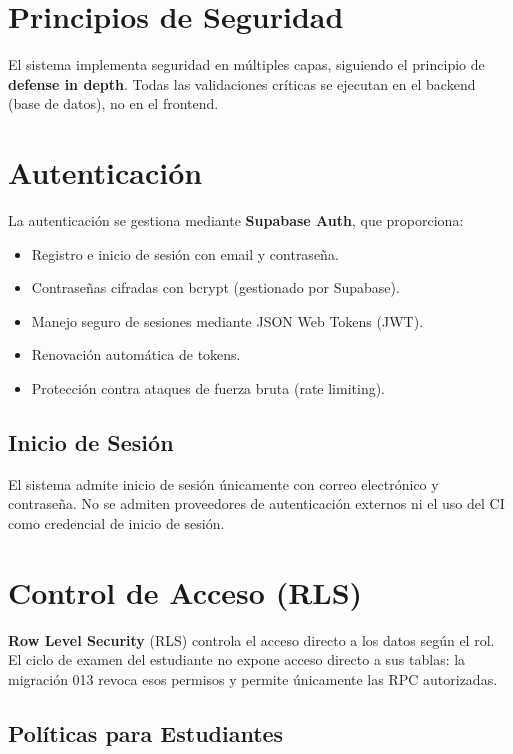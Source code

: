 \section{Principios de Seguridad}

El sistema implementa seguridad en múltiples capas, siguiendo el principio de \textbf{defense in depth}. Todas las validaciones críticas se ejecutan en el backend (base de datos), no en el frontend.

\section{Autenticación}

La autenticación se gestiona mediante \textbf{Supabase Auth}, que proporciona:

\begin{itemize}
    \item Registro e inicio de sesión con email y contraseña.
    \item Contraseñas cifradas con bcrypt (gestionado por Supabase).
    \item Manejo seguro de sesiones mediante JSON Web Tokens (JWT).
    \item Renovación automática de tokens.
    \item Protección contra ataques de fuerza bruta (rate limiting).
\end{itemize}

\subsection{Inicio de Sesión}

El sistema admite inicio de sesión únicamente con correo electrónico y contraseña. No se admiten proveedores de autenticación externos ni el uso del CI como credencial de inicio de sesión.

\section{Control de Acceso (RLS)}

\textbf{Row Level Security} (RLS) controla el acceso directo a los datos según el rol. El ciclo de examen del estudiante no expone acceso directo a sus tablas: la migración 013 revoca esos permisos y permite únicamente las RPC autorizadas.

\subsection{Políticas para Estudiantes}

